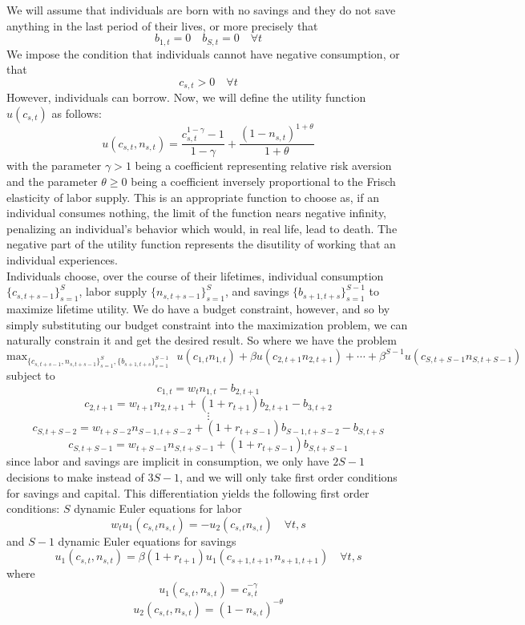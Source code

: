 \documentclass[letterpaper,12pt]{article}
\theoremstyle{definition}
\begin{document}
We will assume that individuals are born with no savings and they do not save anything in the last period of their lives, or more precisely that
\[b_{1,t} = 0 \quad b_{S,t} = 0\quad  \forall t\]
We impose the condition that individuals cannot have negative consumption, or that 
\[c_{s,t} > 0 \quad  \forall t\]
However, individuals can borrow. Now, we will define the utility function $u(c_{s,t})$ as follows:
\[ u(c_{s,t},n_{s,t}) = \frac{c_{s,t}^{1-\gamma} - 1}{1 - \gamma} + \frac{(1-n_{s,t})^{1+\theta}}{1+\theta}\]
with the parameter $\gamma > 1$ being a coefficient representing relative risk aversion and the parameter $\theta \geq 0$ being a coefficient inversely proportional to the Frisch elasticity of labor supply. This is an appropriate function to choose as, if an individual consumes nothing, the limit of the function nears negative infinity, penalizing an individual's behavior which would, in real life, lead to death. The negative part of the utility function represents the disutility of working that an individual experiences.\\
\indent Individuals choose, over the course of their lifetimes, individual consumption $\{c_{s,t+s-1}\}_{s=1}^S$, labor supply $\{n_{s,t+s-1}\}_{s=1}^S$, and savings $\{b_{s+1,t+s}\}_{s=1}^{S-1}$ to maximize lifetime utility. We do have a budget constraint, however, and so by simply substituting our budget constraint into the maximization problem, we can naturally constrain it and get the desired result. So where we have the problem
\[ \text{max}_{\{c_{s,t+s-1},n_{s,t+s-1}\}_{s=1}^S,\{b_{s+1,t+s}\}_{s=1}^{S-1}} ~ ~ ~u(c_{1,t}n_{1,t}) + \beta u(c_{2,t+1}n_{2,t+1}) + \cdots + \beta^{S-1} u(c_{S,t+S - 1}n_{S,t+ S -1})\]
subject to
\[ c_{1,t} = w_tn_{1,t} - b_{2,t+1} \]
\[ c_{2,t+1} = w_{t+1}n_{2,t+1} + (1+r_{t+1})b_{2,t+1} - b_{3,t+2} \]
\[\vdots\]
\[ c_{S,t+S-2} = w_{t+S-2}n_{S-1,t+ S-2} + (1+r_{t+S-1})b_{S-1,t+S-2} - b_{S,t+S} \]
\[ c_{S,t+S-1} = w_{t+S-1}n_{S,t+ S-1} + (1+r_{t+S-1})b_{S,t+S-1}\]
since labor and savings are implicit in consumption, we only have $2S-1$ decisions to make instead of $3S - 1$, and we will only take first order conditions for savings and capital. This differentiation yields the following first order conditions: $S$ dynamic Euler equations for labor
\[w_tu_1(c_{s,t}n_{s,t}) = -u_2(c_{s,t} n_{s,t}) \quad \forall t,s\]
and $S-1$ dynamic Euler equations for savings
\[u_1(c_{s,t}, n_{s,t}) = \beta (1 + r_{t+1}) u_1 (c_{s+1, t+1}, n_{s+1, t+1})\quad  \forall t,s \]
where 
\[u_1(c_{s,t}, n_{s,t}) = c_{s,t}^{-\gamma} \]
\[u_2(c_{s,t}, n_{s,t}) = (1 - n_{s,t})^{-\theta} \]
\end{document}
